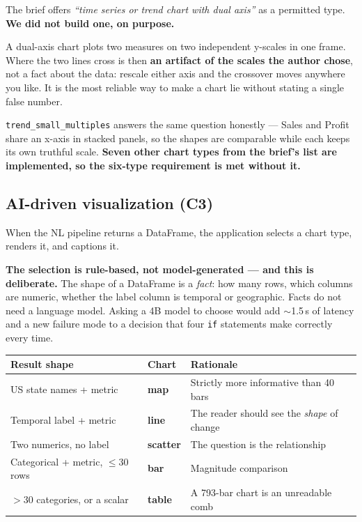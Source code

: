 \documentclass[11pt,a4paper]{article}
\begin{document}
The brief offers \emph{``time series or trend chart with dual axis''} as a permitted
type. \textbf{We did not build one, on purpose.}

A dual-axis chart plots two measures on two independent y-scales in one frame. Where the
two lines cross is then \textbf{an artifact of the scales the author chose}, not a fact
about the data: rescale either axis and the crossover moves anywhere you like. It is the
most reliable way to make a chart lie without stating a single false number.

\texttt{trend\_small\_multiples} answers the same question honestly --- Sales and Profit
share an x-axis in stacked panels, so the shapes are comparable while each keeps its own
truthful scale. \textbf{Seven other chart types from the brief's list are implemented, so
the six-type requirement is met without it.}

\subsection{AI-driven visualization (C3)}

When the NL pipeline returns a DataFrame, the application selects a chart type, renders
it, and captions it.

\textbf{The selection is rule-based, not model-generated --- and this is deliberate.}
The shape of a DataFrame is a \emph{fact}: how many rows, which columns are numeric,
whether the label column is temporal or geographic. Facts do not need a language model.
Asking a 4B model to choose would add $\sim$1.5\,s of latency and a new failure mode to
a decision that four \texttt{if} statements make correctly every time.

\begin{center}
\begin{tabularx}{\textwidth}{@{}llX@{}}
\toprule
\textbf{Result shape} & \textbf{Chart} & \textbf{Rationale} \\
\midrule
US state names + metric            & \textbf{map}     & Strictly more informative than 40 bars \\
Temporal label + metric            & \textbf{line}    & The reader should see the \emph{shape} of change \\
Two numerics, no label             & \textbf{scatter} & The question is the relationship \\
Categorical + metric, $\le$30 rows & \textbf{bar}     & Magnitude comparison \\
$>$30 categories, or a scalar      & \textbf{table}   & A 793-bar chart is an unreadable comb \\
\bottomrule
\end{tabularx}
\end{center}
\end{document}
